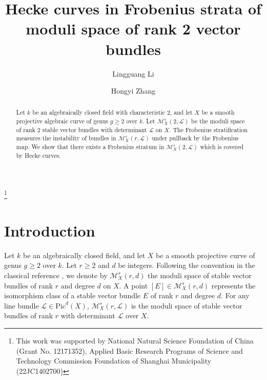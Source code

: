 \documentclass{kms-b}
\numberwithin{equation}{section}
\theoremstyle{plain}
\theoremstyle{definition}
\theoremstyle{remark}
\begin{document}
\title[Hecke Curves in Frobenius Strata]
{Hecke curves in Frobenius strata of moduli space of
rank 2 vector bundles}

\author[L. Li]{Lingguang Li}
\address{Lingguang Li \\Key Laboratory of Intelligent Computing and Applications (Ministry of Edu-\\cation), School of Mathematical Sciences\\Tongji University \\ Shanghai 200092, China}

\author[H. Zhang]{Hongyi Zhang}
\address{Hongyi Zhang \\ School of Mathematical Sciences\\ Tongji University \\ Shanghai 200092, China}
\thanks{This work was supported by National Natural Science Foundation of China (Grant No. 12171352), Applied Basic Research Programs of Science and Technology Commission Foundation of Shanghai Municipality (22JC1402700)}


\begin{abstract}
Let $k$ be an algebraically closed field with characteristic $2$, and let $X$ be a smooth projective algebraic curve of genus $g \geqslant 2$ over $k$. Let $\mathcal{M}^s_X(2,\mathcal{L})$ be the moduli space of rank $2$ stable vector bundles with determinant $\mathcal{L}$ on $X$. The Frobenius stratification measures the instability of
bundles in $\mathcal{M}^s_X(r,\mathcal{L})$ under pullback by the Frobenius map. We show that there exists a Frobenius stratum in $\mathcal{M}^s_X(2,\mathcal{L})$ which is covered by Hecke curves.
\end{abstract}

\maketitle

\section{Introduction}\label{intro}
Let $k$ be an algebraically closed field, and let $X$ be a smooth projective curve of genus $g \geqslant 2$ over $k$. Let $r\geqslant 2$ and $d$ be integers. Following the convention in the classical reference \cite{LeP}, we denote by $\mathcal{M}^s_X(r,d)$ the moduli space of stable vector bundles of rank $r$ and degree $d$ on $X$. A point $[E] \in \mathcal{M}^s_X(r,d)$ represents the isomorphism class of a stable vector bundle $E$ of rank $r$ and degree $d$. For any line bundle $\mathcal{L} \in \mathrm{Pic}^d(X)$, $\mathcal{M}_X^s(r,\mathcal{L})$ is the moduli space of stable vector bundles of rank $r$ with determinant $\mathcal{L}$ over $X$.  
\end{document}
